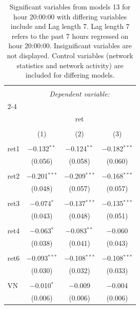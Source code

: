 
\begin{table}[!htbp] \centering 
  \caption{Significant variables from models 13 for hour 20:00:00 with differing variables include 
                               and Lag length 7. Lag length 7 refers to the past 7 hours regressed on hour 20:00:00. 
                               Insignificant variables are not displayed. 
                               Control variables (network statistics and network activity) are 
                               included for differing models.} 
  \label{RVmodels2_t_hourlagged7} 
\scriptsize 
\begin{tabular}{@{\extracolsep{5pt}}lccc} 
\\[-1.8ex]\hline 
\hline \\[-1.8ex] 
 & \multicolumn{3}{c}{\textit{Dependent variable:}} \\ 
\cline{2-4} 
\\[-1.8ex] & \multicolumn{3}{c}{ret} \\ 
\\[-1.8ex] & (1) & (2) & (3)\\ 
\hline \\[-1.8ex] 
 ret1 & $-$0.132$^{**}$ & $-$0.124$^{**}$ & $-$0.182$^{***}$ \\ 
  & (0.056) & (0.058) & (0.060) \\ 
  & & & \\ 
 ret2 & $-$0.201$^{***}$ & $-$0.209$^{***}$ & $-$0.168$^{***}$ \\ 
  & (0.048) & (0.057) & (0.057) \\ 
  & & & \\ 
 ret3 & $-$0.074$^{*}$ & $-$0.137$^{***}$ & $-$0.135$^{***}$ \\ 
  & (0.043) & (0.048) & (0.051) \\ 
  & & & \\ 
 ret4 & $-$0.063$^{*}$ & $-$0.083$^{**}$ & $-$0.060 \\ 
  & (0.038) & (0.041) & (0.043) \\ 
  & & & \\ 
 ret6 & $-$0.093$^{***}$ & $-$0.108$^{***}$ & $-$0.108$^{***}$ \\ 
  & (0.030) & (0.032) & (0.033) \\ 
  & & & \\ 
 VN & $-$0.010$^{*}$ & $-$0.009 & $-$0.004 \\ 
  & (0.006) & (0.006) & (0.006) \\ 

\end{tabular}
\end{table}
